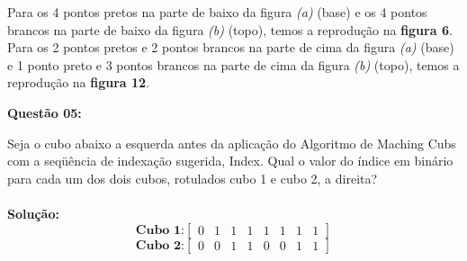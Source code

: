 Para os 4 pontos pretos na parte de baixo da figura \emph{(a)} (base) e os 4 pontos brancos na parte de baixo da figura \emph{(b)} (topo), temos a reprodução na \textbf{figura 6}.
\\

Para os 2 pontos pretos e 2 pontos brancos na parte de cima da figura \emph{(a)} (base) e 1 ponto preto e 3 pontos brancos na parte de cima da figura \emph{(b)} (topo), temos a reprodução na \textbf{figura 12}.

\vspace{1cm}
\noindent\textbf{Questão 05:}

Seja o cubo abaixo a esquerda antes da aplicação do Algoritmo de Maching Cubs com a seqüência de indexação sugerida, Index. Qual o valor do índice em binário para cada um dos dois cubos, rotulados cubo 1 e cubo 2, a direita?\\
\\
\noindent\textbf{Solução:}
\[
\textbf{Cubo 1:}
\begin{bmatrix}
0 & 1 & 1 & 1 & 1 & 1 & 1 & 1
\end{bmatrix}
\]
\vspace{0.5cm}
\[
\textbf{Cubo 2:}
\begin{bmatrix}
0 & 0 & 1 & 1 & 0 & 0 & 1 & 1
\end{bmatrix}
\]


